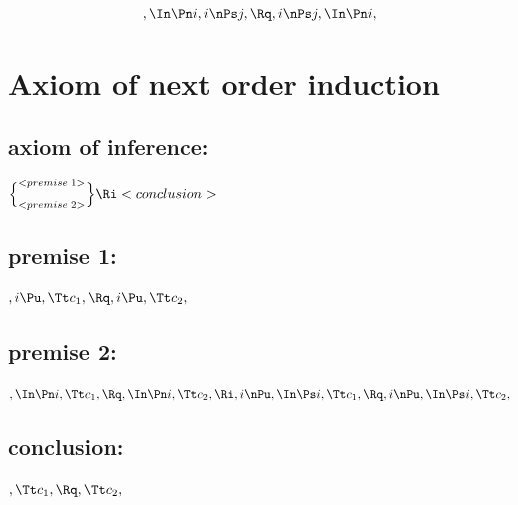\[,\In \Pn i, i \nPs j, \Rq , i \nPs j, \In \Pn i,\]


\bigskip
\bigskip
\bigskip
\bigskip
\section{Axiom of next order induction}
\subsection{axiom of inference:}
\begin{math}
\Bigl\{ ^{<premise \; 1>}_{<premise \;  2>}\Bigl\} \Ri <conclusion>
\end{math}
\bigskip
\bigskip
\subsection{premise 1:}
\begin{math}
, i \Pu, \Tt c_1, \Rq , i \Pu, \Tt c_2,
\end{math}
\bigskip
\bigskip
\subsection{premise 2:}
\begin{math}
, \In \Pn i, \Tt c_1 , \Rq , \In \Pn i, \Tt c_2 , \Ri \\\\
,i \nPu, \In \Ps i, \Tt c_1, \Rq , i \nPu, \In \Ps i, \Tt c_2,
\end{math}
\bigskip
\bigskip
\subsection{conclusion:}
\begin{math}
, \Tt c_1, \Rq , \Tt c_2,
\end{math}



\newpage